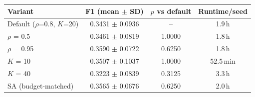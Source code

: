 \begin{tabular}{lccc}
\toprule
Variant & F1 (mean $\pm$ SD) & $p$ vs default & Runtime/seed \\
\midrule
Default ($\rho$=0.8, $K$=20) & 0.3431 $\pm$ 0.0936 & -- & 1.9\,h \\
$\rho$ = 0.5 & 0.3461 $\pm$ 0.0819 & 1.0000 & 1.8\,h \\
$\rho$ = 0.95 & 0.3590 $\pm$ 0.0722 & 0.6250 & 1.8\,h \\
$K$ = 10 & 0.3507 $\pm$ 0.1037 & 1.0000 & 52.5\,min \\
$K$ = 40 & 0.3223 $\pm$ 0.0839 & 0.3125 & 3.3\,h \\
SA (budget-matched) & 0.3565 $\pm$ 0.0676 & 0.6250 & 2.0\,h \\
\bottomrule
\end{tabular}
